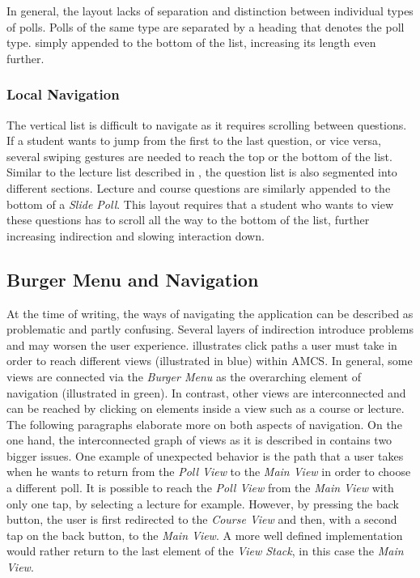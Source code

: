 In general, the layout lacks of separation and distinction between individual types of polls.
Polls of the same type are separated by a heading that denotes the poll type. simply appended to the bottom of the list, increasing its length even further.
\todogrf
\subsubsection{Local Navigation}

The vertical list is difficult to navigate as it requires scrolling between questions. If a student wants to jump from the first to the last question, or vice versa, several swiping gestures are needed to reach the top or the bottom of the list.
Similar to the lecture list described in , the question list is also segmented into different sections. Lecture and course questions are similarly appended to the bottom of a \emph{Slide Poll}. This layout requires that a student who wants to view these questions has to scroll all the way to the bottom of the list, further increasing indirection and slowing interaction down.



\subsection{Burger Menu and Navigation}
\label{section:con:problems:navigation}

At the time of writing, the ways of navigating the application can be described as problematic and partly confusing. Several layers of indirection introduce problems and may worsen the user experience.
 illustrates click paths a user must take in order to reach different views (illustrated in blue) within AMCS. In general, some views are connected via the \emph{Burger Menu} as the overarching element of navigation (illustrated in green). In contrast, other views are interconnected and can be reached by clicking on elements inside a view such as a course or lecture. The following paragraphs elaborate more on both aspects of navigation.
\newline
\newline
On the one hand, the interconnected graph of views as it is described in  contains two bigger issues. One example of unexpected behavior is the path that a user takes when he wants to return from the \emph{Poll View} to the \emph{Main View} in order to choose a different poll.
It is possible to reach the \emph{Poll View} from the \emph{Main View} with only one tap, by selecting a lecture for example.
However, by pressing the back button, the user is first redirected to the \emph{Course View} and then, with a second tap on the back button, to the \emph{Main View}. A more well defined implementation would rather return to the last element of the \emph{View Stack}, in this case the \emph{Main View}.
 
